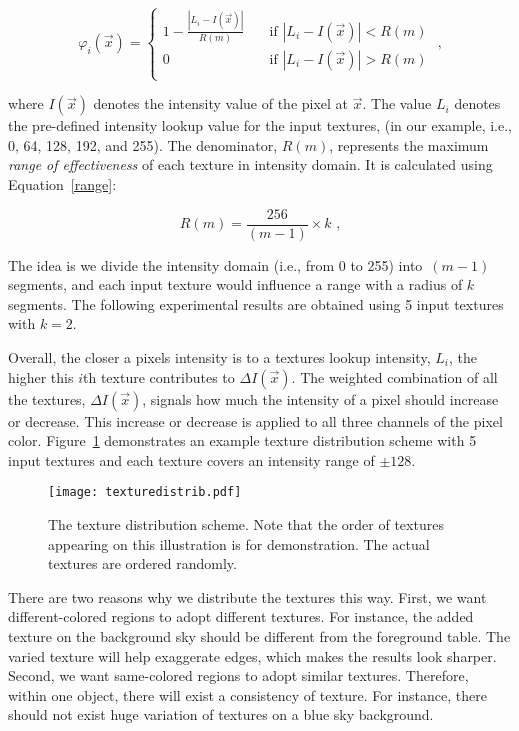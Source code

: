 \begin{equation}\label{eq:textureEnrichWeight }
\varphi_i(\vec{x})=   
\begin{cases}
    1 - \frac{|L_i - I(\vec{x})|}{R(m)}       & \quad \text{if } |L_i - I(\vec{x})|<R(m)\\
    0                                                         & \quad \text{if } |L_i - I(\vec{x})|>R(m)\\
  \end{cases} \text{ ,}
\end{equation}

where $ I(\vec{x})$ denotes the intensity value of the pixel at $\vec{x}$. The value $L_i$ denotes the pre-defined intensity lookup value for the input textures, (in our example, i.e., 0, 64, 128, 192, and 255). The denominator, $R(m)$, represents the maximum \textit{range of effectiveness} of each texture in intensity domain. It is calculated using Equation~\eqref{range}:

\begin{equation}\label{range}
R(m) = \frac{256}{(m-1)} \times k \text{ ,}
\end{equation}

The idea is we divide the intensity domain (i.e., from 0 to 255) into~$(m-1)$ segments, and each input texture would influence a range with a radius of $k$ segments. The following experimental results are obtained using 5 input textures with $k=2$. 

Overall, the closer a pixel\textquotesingle s intensity is to a texture\textquotesingle s lookup intensity, $L_i$, the higher this $i$th texture contributes to $\Delta I(\vec{x})$. The weighted combination of all the textures, $\Delta I(\vec{x})$, signals how much the intensity of a pixel should increase or decrease. This increase or decrease is applied to all three channels of the pixel color. Figure~\ref{fig:textureDistribution} demonstrates an example texture distribution scheme with 5 input textures and each texture covers an intensity range of $\pm 128$. 


\begin{figure}[htbp]
\texttt{[image: texturedistrib.pdf]}
\caption{The texture distribution scheme. Note that the order of textures appearing on this illustration is for demonstration. The actual textures are ordered randomly.}
\label{fig:textureDistribution}
\end{figure}


There are two reasons why we distribute the textures this way. First, we want different-colored regions to adopt different textures. For instance, the added texture on the background sky should be different from the foreground table. The varied texture will help exaggerate edges, which makes the results look sharper. Second, we want same-colored regions to adopt similar textures. Therefore, within one object, there will exist a consistency of texture.  For instance, there should not exist huge variation of textures on a blue sky background.

